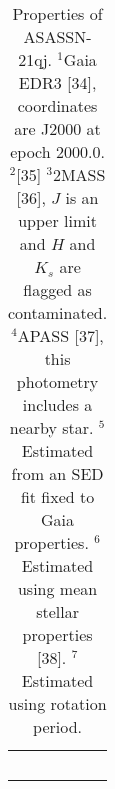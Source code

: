 \documentclass[sn-nature]{sn-jnl}%
\newcommand{\asas}{ASASSN-21qj}
\begin{document}
\begin{table}
    \centering
    \caption{Properties of \asas.
      $^1$Gaia EDR3 [34], coordinates are J2000 at epoch 2000.0.
      $^2$[35]
$^3$2MASS [36], $J$ is an upper limit and $H$ and $K_s$ are flagged as contaminated.
%
$^4$APASS [37], this photometry includes a nearby star.
%
$^5$Estimated from an SED fit fixed to Gaia properties.
%
$^6$Estimated using mean stellar properties [38].
%
      $^7$Estimated using rotation period.}
    \begin{tabular}{p{}}
      \, \\
      \end{tabular}

\end{table}
\end{document}
